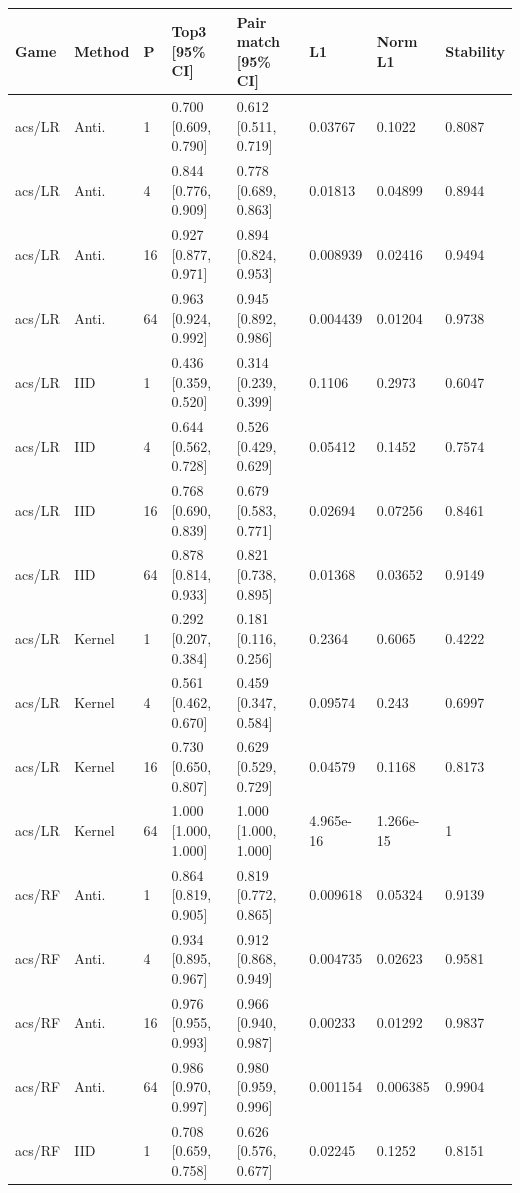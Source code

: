 \endgroup


\begingroup\footnotesize\setlength{\tabcolsep}{3pt}
\begin{tabular}{llllllll}
\toprule
Game & Method & P & Top3 [95\% CI] & Pair match [95\% CI] & L1 & Norm L1 & Stability \\
\midrule
acs/LR & Anti. & 1 & 0.700 [0.609, 0.790] & 0.612 [0.511, 0.719] & 0.03767 & 0.1022 & 0.8087 \\
acs/LR & Anti. & 4 & 0.844 [0.776, 0.909] & 0.778 [0.689, 0.863] & 0.01813 & 0.04899 & 0.8944 \\
acs/LR & Anti. & 16 & 0.927 [0.877, 0.971] & 0.894 [0.824, 0.953] & 0.008939 & 0.02416 & 0.9494 \\
acs/LR & Anti. & 64 & 0.963 [0.924, 0.992] & 0.945 [0.892, 0.986] & 0.004439 & 0.01204 & 0.9738 \\
acs/LR & IID & 1 & 0.436 [0.359, 0.520] & 0.314 [0.239, 0.399] & 0.1106 & 0.2973 & 0.6047 \\
acs/LR & IID & 4 & 0.644 [0.562, 0.728] & 0.526 [0.429, 0.629] & 0.05412 & 0.1452 & 0.7574 \\
acs/LR & IID & 16 & 0.768 [0.690, 0.839] & 0.679 [0.583, 0.771] & 0.02694 & 0.07256 & 0.8461 \\
acs/LR & IID & 64 & 0.878 [0.814, 0.933] & 0.821 [0.738, 0.895] & 0.01368 & 0.03652 & 0.9149 \\
acs/LR & Kernel & 1 & 0.292 [0.207, 0.384] & 0.181 [0.116, 0.256] & 0.2364 & 0.6065 & 0.4222 \\
acs/LR & Kernel & 4 & 0.561 [0.462, 0.670] & 0.459 [0.347, 0.584] & 0.09574 & 0.243 & 0.6997 \\
acs/LR & Kernel & 16 & 0.730 [0.650, 0.807] & 0.629 [0.529, 0.729] & 0.04579 & 0.1168 & 0.8173 \\
acs/LR & Kernel & 64 & 1.000 [1.000, 1.000] & 1.000 [1.000, 1.000] & 4.965e-16 & 1.266e-15 & 1 \\
acs/RF & Anti. & 1 & 0.864 [0.819, 0.905] & 0.819 [0.772, 0.865] & 0.009618 & 0.05324 & 0.9139 \\
acs/RF & Anti. & 4 & 0.934 [0.895, 0.967] & 0.912 [0.868, 0.949] & 0.004735 & 0.02623 & 0.9581 \\
acs/RF & Anti. & 16 & 0.976 [0.955, 0.993] & 0.966 [0.940, 0.987] & 0.00233 & 0.01292 & 0.9837 \\
acs/RF & Anti. & 64 & 0.986 [0.970, 0.997] & 0.980 [0.959, 0.996] & 0.001154 & 0.006385 & 0.9904 \\
acs/RF & IID & 1 & 0.708 [0.659, 0.758] & 0.626 [0.576, 0.677] & 0.02245 & 0.1252 & 0.8151 \\

\end{tabular}
